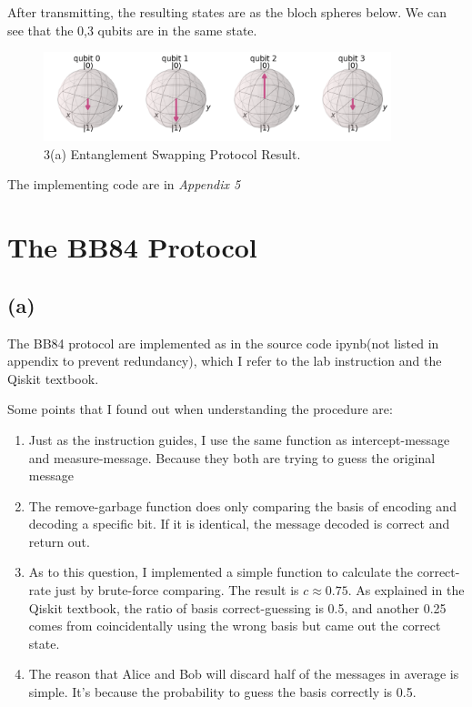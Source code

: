 \documentclass{article}
\begin{document}
\begin{CJK*}{UTF8}{bsmi}
After transmitting, the resulting states are as the bloch spheres below. We can see that the 0,3 qubits are in the same state.
    \begin{figure}[h]
    \centering
    \includegraphics[width=0.9\textwidth]{2bfig.png}
    \caption{\label{fig:2bfig}3(a) Entanglement Swapping Protocol Result.}
    \end{figure}

The implementing code are in \emph {Appendix 5}
\section{The BB84 Protocol}
\subsection{(a)}
The BB84 protocol are implemented as in the source code ipynb(not listed in appendix to prevent redundancy), which I refer to the lab instruction and the Qiskit textbook.

Some points that I found out when understanding the procedure are:
\begin{enumerate}
    \item Just as the instruction guides, I use the same function as intercept-message and measure-message. Because they both are trying to guess the original message
    \item The remove-garbage function does only comparing the basis of encoding and decoding a specific bit. If it is identical, the message decoded is correct and return out.
    \item As to this question, I implemented a simple function to calculate the correct-rate just by brute-force comparing. The result is $ c \approx 0.75$.
    As explained in the Qiskit textbook, the ratio of basis correct-guessing is 0.5, and another 0.25 comes from coincidentally using the wrong basis but came out the correct state.
    \item The reason that Alice and Bob will discard half of the messages in average is simple. It's because the probability to guess the basis correctly is 0.5.

\end{enumerate}


\end{CJK*}
\end{document}
